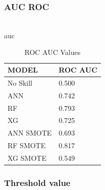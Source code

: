\subsubsection{AUC ROC}\hspace*{\fill} \\
auc 
\begin{table}[H]
    \begin{tabular}{|l|l|}
    \hline
    MODEL     & ROC AUC \\ \hline
    No Skill  & 0.500   \\ \hline
    ANN       & 0.742   \\ \hline
    RF        & 0.793   \\ \hline
    XG        & 0.725   \\ \hline
    ANN SMOTE & 0.693   \\ \hline
    RF SMOTE  & 0.817   \\ \hline
    XG SMOTE  & 0.549   \\ \hline
    \end{tabular}
    \caption{ROC AUC Values}
    \label{tab: roc_auc}
\end{table}

\subsubsection{Threshold value}\hspace*{\fill} \\

